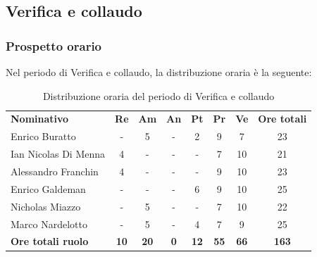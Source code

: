 \documentclass[../piano-di-progetto.tex]{subfiles}
\begin{document}
  \subsection{Verifica e collaudo}

  \subsubsection{Prospetto orario}
  Nel periodo di Verifica e collaudo, la distribuzione oraria è la seguente:
  \begin{table}[H]
    \centering
    \begin{tabular}{lccccccc}
      \rowcolor{lightgray}
      \textbf{Nominativo}        & \textbf{Re} & \textbf{Am}  & \textbf{An} & \textbf{Pt}  & \textbf{Pr}   & \textbf{Ve} & \textbf{Ore totali} \\
      Enrico Buratto            & -           & 5           & -          & 2           & 9           & 7           & 23           \\
      Ian Nicolas Di Menna      & 4           & -           & -          & -           & 7           & 10          & 21           \\
      Alessandro Franchin       & 4           & -           & -          & -           & 9           & 10          & 23           \\
      Enrico Galdeman           & -           & -           & -          & 6           & 9           & 10          & 25           \\
      Nicholas Miazzo           & -           & 5           & -          & -           & 7           & 10          & 22           \\
      Marco Nardelotto          & -           & 5           & -          & 4           & 7           & 9           & 25           \\
      \textbf{Ore totali ruolo} & \textbf{10} & \textbf{20} & \textbf{0} & \textbf{12} & \textbf{55} & \textbf{66} & \textbf{163} 
    \end{tabular}
    \caption{Distribuzione oraria del periodo di Verifica e collaudo}
  \end{table}
\end{document}
